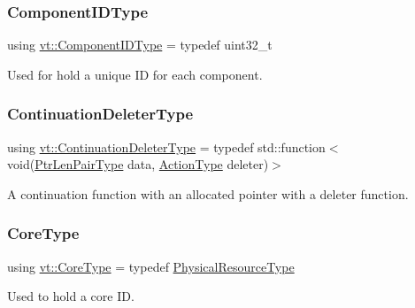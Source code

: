 \mbox{\label{namespacevt_ab6ac935c168b809c422d5121da4f2700}} 
\subsubsection{\texorpdfstring{Component\+I\+D\+Type}{ComponentIDType}}
{\footnotesize\ttfamily using \hyperlink{namespacevt_ab6ac935c168b809c422d5121da4f2700}{vt\+::\+Component\+I\+D\+Type} = typedef uint32\+\_\+t}



Used for hold a unique ID for each component. 

\mbox{\label{namespacevt_a6de3bd201e2a040be9362d9d24d1e446}} 
\subsubsection{\texorpdfstring{Continuation\+Deleter\+Type}{ContinuationDeleterType}}
{\footnotesize\ttfamily using \hyperlink{namespacevt_a6de3bd201e2a040be9362d9d24d1e446}{vt\+::\+Continuation\+Deleter\+Type} = typedef std\+::function$<$void(\hyperlink{namespacevt_a97f320a1d3b9b4035e591671cd7d10f0}{Ptr\+Len\+Pair\+Type} data, \hyperlink{namespacevt_ae0a5a7b18cc99d7b732cb4d44f46b0f3}{Action\+Type} deleter)$>$}



A continuation function with an allocated pointer with a deleter function. 

\mbox{\label{namespacevt_a74b11b22c02feaabab8591acc87c7c52}} 
\subsubsection{\texorpdfstring{Core\+Type}{CoreType}}
{\footnotesize\ttfamily using \hyperlink{namespacevt_a74b11b22c02feaabab8591acc87c7c52}{vt\+::\+Core\+Type} = typedef \hyperlink{namespacevt_a2dc36fcada816dc6d11774d650328ee9}{Physical\+Resource\+Type}}



Used to hold a core ID. 

